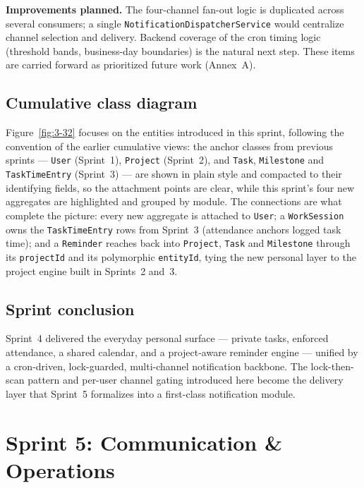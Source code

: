 \textbf{Improvements planned.} The four-channel fan-out logic is duplicated across several
consumers; a single \texttt{NotificationDispatcherService} would centralize channel selection
and delivery. Backend coverage of the cron timing logic (threshold bands, business-day
boundaries) is the natural next step. These items are carried forward as prioritized future work (Annex~A).

\subsection{Cumulative class diagram}

Figure~\ref{fig:3-32} focuses on the entities introduced in this sprint, following the
convention of the earlier cumulative views: the anchor classes from previous sprints ---
\texttt{User} (Sprint~1), \texttt{Project} (Sprint~2), and \texttt{Task}, \texttt{Milestone} and
\texttt{TaskTimeEntry} (Sprint~3) --- are shown in plain style and compacted to their
identifying fields, so the attachment points are clear, while this sprint's four new
aggregates are highlighted and grouped by module. The
connections are what complete the picture: every new aggregate is attached to \texttt{User}; a
\texttt{WorkSession} owns the \texttt{TaskTimeEntry} rows from Sprint~3 (attendance
anchors logged task time); and a \texttt{Reminder} reaches back into \texttt{Project},
\texttt{Task} and \texttt{Milestone} through its \texttt{projectId} and its polymorphic
\texttt{entityId}, tying the new personal layer to the project engine built in Sprints~2 and~3.


\subsection{Sprint conclusion}

Sprint~4 delivered the everyday personal surface --- private tasks, enforced attendance, a
shared calendar, and a project-aware reminder engine --- unified by a cron-driven, lock-guarded,
multi-channel notification backbone. The lock-then-scan pattern and per-user channel gating
introduced here become the delivery layer that Sprint~5 formalizes into a first-class
notification module.

\clearpage
\section{Sprint 5: Communication \& Operations}

